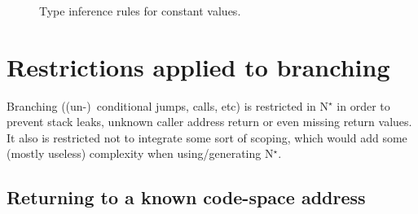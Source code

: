 \begin{figure}[htb]
  \centering

  \begin{prooftree}
  \end{prooftree}
  \\\vspace{\baselineskip}
  \begin{prooftree}
  \end{prooftree}
  \\\vspace{\baselineskip}
  \begin{prooftree}
  \end{prooftree}
  \\\vspace{\baselineskip}
  \begin{prooftree}
  \end{prooftree}

  \caption{Type inference rules for constant values.}
  \label{fig:nstar-common-constvalue-typerules}
\end{figure}

\section{Restrictions applied to branching}\label{sec:nstar-common-bs-restrictions}

Branching ((un-)\ conditional jumps, calls, etc) is restricted in N$^\star$ in order to prevent stack leaks, unknown caller address return or even missing return values.
It also is restricted not to integrate some sort of scoping, which would add some (mostly useless) complexity when using/generating N$^\star$.

\subsection{Returning to a known code-space address}\label{subsec:nstar-common-bs-restrictions-ret}

